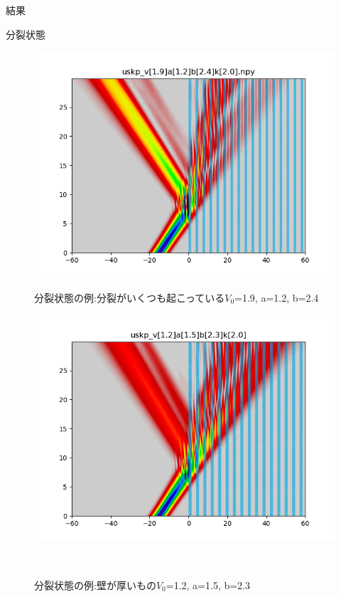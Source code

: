 \documentclass[a4paper, lualatex]{bxjsarticle}
\begin{document}
\begin{section}{結果}
    \begin{subsection}{分裂状態}
        \begin{figure}[h]
            \begin{minipage}{0.5\hsize}
                \centering
                \includegraphics[width=0.9\hsize]{bunretsu1.png}
                \caption{分裂状態の例:分裂がいくつも起こっている$V_0$=1.9, a=1.2, b=2.4}
                \label{split_multi}
            \end{minipage}
            \begin{minipage}{0.5\hsize}
                \centering
                \includegraphics[width=0.9\hsize]{bunretsu2.png}
                \caption{分裂状態の例:壁が厚いもの$V_0$=1.2, a=1.5, b=2.3}
            \end{minipage}\\
            \begin{minipage}{0.5\hsize}

\end{minipage}
\end{figure}
\end{subsection}
\end{section}
\end{document}
